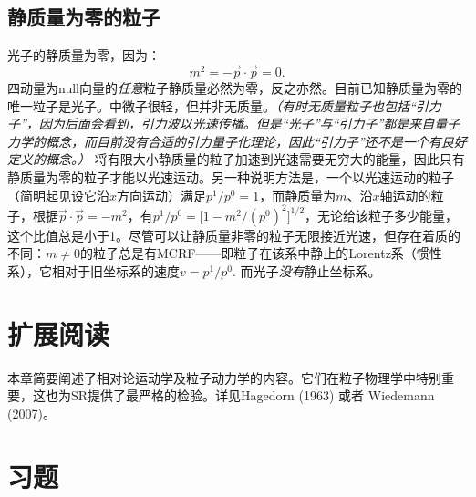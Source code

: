 \subsection*{静质量为零的粒子}
光子的静质量为零，因为：
\begin{equation}
    m^2 = -\vec{p} \cdot \vec{p} = 0.
\label{equ2.40}
\end{equation}
四动量为null向量的\textit{任意}粒子静质量必然为零，反之亦然。目前已知静质量为零的唯一粒子是光子。中微子很轻，但并非无质量。\textit{（有时无质量粒子也包括“引力子”，因为后面会看到，引力波以光速传播。但是“光子”与“引力子”都是来自量子力学的概念，而目前没有合适的引力量子化理论，因此“引力子”还不是一个有良好定义的概念。）} 将有限大小静质量的粒子加速到光速需要无穷大的能量，因此只有静质量为零的粒子才能以光速运动。另一种说明方法是，一个以光速运动的粒子（简明起见设它沿$x$方向运动）满足$p^1 / p^0 = 1$，而静质量为$m$、沿$x$轴运动的粒子，根据$\vec{p} \cdot \vec{p} = -m^2$，有$p^1 / p^0 = \big[ 1 - m^2 / (p^0)^2 \big]^{1/2}$，无论给该粒子多少能量，这个比值总是小于1。尽管可以让静质量非零的粒子无限接近光速，但存在着质的不同：$m \neq 0$的粒子总是有MCRF——即粒子在该系中静止的Lorentz系（惯性系），它相对于旧坐标系的速度$v = p^1 / p^0$. 而光子\textit{没有}静止坐标系。


\section{扩展阅读}
\label{sec2.8}
本章简要阐述了相对论运动学及粒子动力学的内容。它们在粒子物理学中特别重要，这也为SR提供了最严格的检验。详见Hagedorn (1963) 或者 Wiedemann (2007)。

\section{习题}
\label{sec2.9}